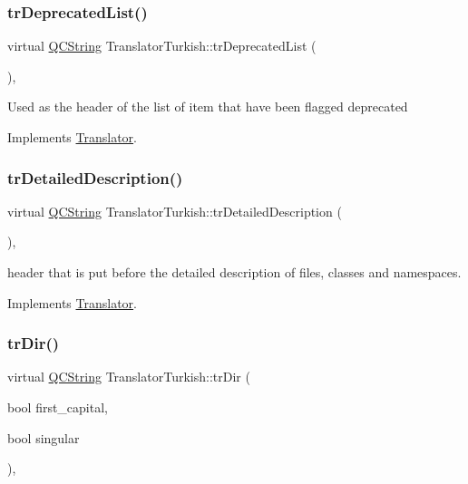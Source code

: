 \subsubsection{\texorpdfstring{trDeprecatedList()}{trDeprecatedList()}}
{\footnotesize\ttfamily virtual \mbox{\hyperlink{class_q_c_string}{Q\+C\+String}} Translator\+Turkish\+::tr\+Deprecated\+List (\begin{DoxyParamCaption}{ }\end{DoxyParamCaption})\hspace{0.3cm}{\ttfamily [inline]}, {\ttfamily [virtual]}}

Used as the header of the list of item that have been flagged deprecated 

Implements \mbox{\hyperlink{class_translator}{Translator}}.

\mbox{\label{class_translator_turkish_a0e3aa2bf3923b46611a49bd16e9e3472}} 
\subsubsection{\texorpdfstring{trDetailedDescription()}{trDetailedDescription()}}
{\footnotesize\ttfamily virtual \mbox{\hyperlink{class_q_c_string}{Q\+C\+String}} Translator\+Turkish\+::tr\+Detailed\+Description (\begin{DoxyParamCaption}{ }\end{DoxyParamCaption})\hspace{0.3cm}{\ttfamily [inline]}, {\ttfamily [virtual]}}

header that is put before the detailed description of files, classes and namespaces. 

Implements \mbox{\hyperlink{class_translator}{Translator}}.

\mbox{\label{class_translator_turkish_abee36941632f435d887e03c6b0561f55}} 
\subsubsection{\texorpdfstring{trDir()}{trDir()}}
{\footnotesize\ttfamily virtual \mbox{\hyperlink{class_q_c_string}{Q\+C\+String}} Translator\+Turkish\+::tr\+Dir (\begin{DoxyParamCaption}\item[{bool}]{first\+\_\+capital,  }\item[{bool}]{singular }\end{DoxyParamCaption})\hspace{0.3cm}{\ttfamily [inline]}, {\ttfamily [virtual]}}

